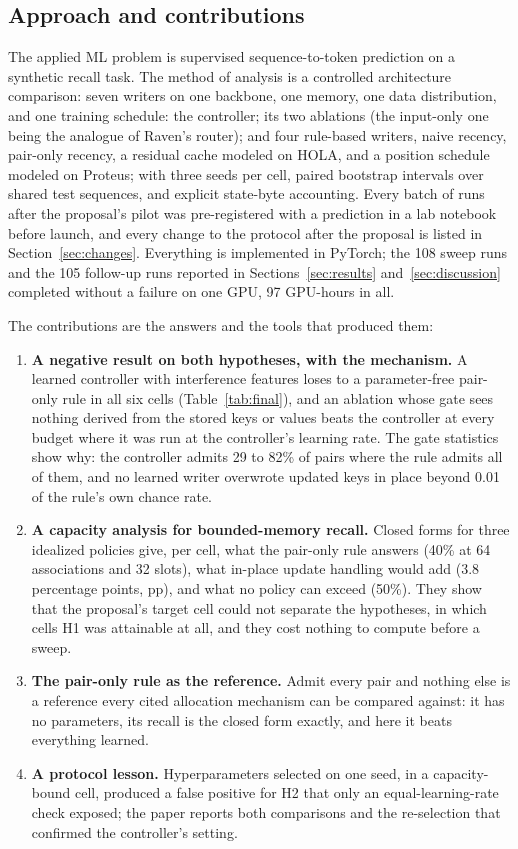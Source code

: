 \documentclass[conference]{IEEEtran}
\begin{document}
\subsection{Approach and contributions}

The applied ML problem is supervised sequence-to-token prediction on a
synthetic recall task. The method of analysis is a controlled architecture
comparison: seven writers on one backbone, one memory, one data
distribution, and one training schedule: the controller; its two ablations
(the input-only one being the analogue of Raven's router); and four rule-based
writers, naive recency, pair-only recency, a residual cache modeled on HOLA,
and a position schedule modeled on Proteus; with
three seeds per cell, paired bootstrap intervals over shared test sequences,
and explicit state-byte accounting. Every batch of runs after the proposal's
pilot was pre-registered with a prediction in a lab notebook before launch, and every change to the
protocol after the proposal is listed in Section~\ref{sec:changes}.
Everything is implemented in PyTorch; the 108 sweep runs and the 105
follow-up runs reported in Sections~\ref{sec:results} and~\ref{sec:discussion}
completed without a failure on one GPU, 97 GPU-hours in all.

The contributions are the answers and the tools that produced them:
\begin{enumerate}
\item \textbf{A negative result on both hypotheses, with the mechanism.}
A learned controller with interference features loses to a parameter-free
pair-only rule in all six cells (Table~\ref{tab:final}), and an ablation whose
gate sees nothing derived from the stored keys or values beats the controller
at every budget where it was run at the controller's learning rate. The gate
statistics show why: the controller admits 29 to 82\% of pairs where the rule
admits all of them, and no learned writer overwrote updated keys in place
beyond 0.01 of the rule's own chance rate.
\item \textbf{A capacity analysis for bounded-memory recall.} Closed forms
for three idealized policies give, per cell, what the pair-only rule answers
(40\% at 64 associations and 32 slots), what in-place update handling would
add (3.8 percentage points, pp), and what no policy can exceed (50\%). They
show that the proposal's target cell could not separate the hypotheses, in
which cells H1 was attainable at all, and they cost nothing to compute before
a sweep.
\item \textbf{The pair-only rule as the reference.} Admit every pair and
nothing else is a reference every cited allocation mechanism can be compared
against: it has no parameters, its recall is the closed form exactly, and
here it beats everything learned.
\item \textbf{A protocol lesson.} Hyperparameters selected on one seed, in a
capacity-bound cell, produced a false positive for H2 that only an
equal-learning-rate check exposed; the paper reports both comparisons and the
re-selection that confirmed the controller's setting.
\end{enumerate}
\end{document}
